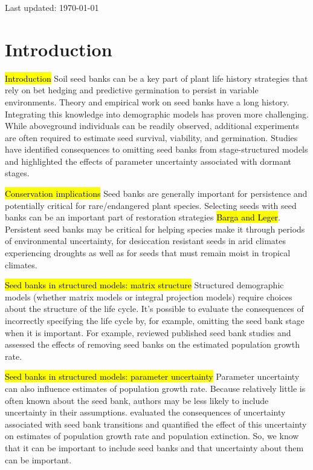 \documentclass[12pt, oneside, titlepage]{article}   	%
\begin{document}
Last updated: \today

\section{Introduction}

\hl{Introduction} Soil seed banks can be a key part of plant life history strategies that rely on bet hedging and predictive germination to persist in variable environments. Theory and empirical work on seed banks have a long history. Integrating this knowledge into demographic models has proven more challenging. While aboveground individuals can be readily observed, additional experiments are often required to estimate seed survival, viability, and germination. Studies have identified consequences to omitting seed banks from stage-structured models and highlighted the effects of parameter uncertainty associated with dormant stages.

\hl{Conservation implications} Seed banks are generally important for persistence and potentially critical for rare/endangered plant species. Selecting seeds with seed banks can be an important part of restoration strategies \hl{Barga and Leger}. Persistent seed banks may be critical for helping species make it through periods of environmental uncertainty, for desiccation resistant seeds in arid climates experiencing droughts as well as for seeds that must remain moist in tropical climates. 

\hl{Seed banks in structured models: matrix structure} Structured demographic models (whether matrix models or integral projection models) require choices about the structure of the life cycle. It's possible to evaluate the consequences of incorrectly specifying the life cycle by, for example, omitting the seed bank stage when it is important. For example, \cite{doak2002,nguyen2019} reviewed published seed bank studies and assessed the effects of removing seed banks on the estimated population growth rate. 

\hl{Seed banks in structured models: parameter uncertainty} Parameter uncertainty can also influence estimates of population growth rate. Because relatively little is often known about the seed bank, authors may be less likely to include uncertainty in their assumptions. \cite{paniw2017} evaluated the consequences of uncertainty associated with seed bank transitions and quantified the effect of this uncertainty on estimates of population growth rate and population extinction. So, we know that it can be important to include seed banks and that uncertainty about them can be important.
\end{document}
